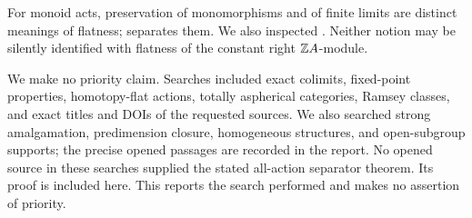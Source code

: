 For monoid acts, preservation of monomorphisms and of finite
limits are distinct meanings of flatness;
\citet[Definition 1.6, Proposition 1.8, Theorems 2.32 and
2.49]{HemelaerRogers2021} separates them. We also inspected
\citet[Proposition 2.4 and the paragraph after Lemma 2.6]{LaanStrongFlat}.
Neither notion may be
silently identified with flatness of the constant right $\mathbb Z A$-module.

We make no priority claim. Searches included exact colimits,
fixed-point properties, homotopy-flat actions, totally aspherical
categories, Ramsey classes, and exact titles and DOIs of the
requested sources. We also searched strong amalgamation,
predimension closure, homogeneous structures, and open-subgroup
supports; the precise opened passages are recorded in the report.
No opened source in these searches supplied the stated all-action
separator theorem. Its proof is included here. This reports the
search performed and makes no assertion of priority.
